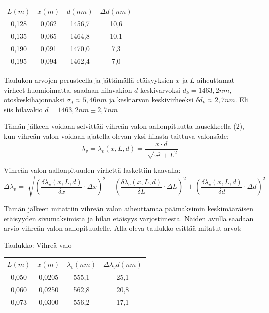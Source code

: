 \documentclass[11pt,a4paper]{article}
\begin{document}
\hspace{2cm}\begin{tabular}{|c|c|c|c|}
\hline
$L(m)$ & $x(m)$ & $d(nm)$ & $\Delta d(nm)$ \\
\hline
0,128 & 0,062 & 1456,7 & 10,6 \\
\hline
0,135 & 0,065 & 1464,8 & 10,1\\
\hline 
0,190 & 0,091 & 1470,0 & 7,3 \\
\hline
0,195 & 0,094 & 1462,4 & 7,0 \\
\hline
\end{tabular}

\pagebreak

\noindent Taulukon arvojen perusteella ja jättämällä etäisyyksien $x$ ja $L$ aiheuttamat virheet huomioimatta, saadaan hilavakion $d$ keskivarvoksi $d_k = 1463,2nm$, otoskeskihajonnaksi ${\sigma}_d \approx 5,46nm$ ja keskiarvon keskivirheeksi $\delta d_k \approx 2,7nm$. Eli siis hilavakio $d=1463,2nm \pm 2,7nm$

Tämän jälkeen voidaan selvittää vihreän valon aallonpituutta lausekkeella (2), kun vihreän valon voidaan ajatella olevan yksi hilasta taittuva valonsäde: 
$${\lambda}_v={\lambda}_v(x,L,d)=\frac{x\cdot d}{\sqrt[]{x^2+L^2}}$$

\noindent Vihreän valon aallonpituuden virhettä laskettiin kaavalla: 
$$\Delta {\lambda}_v= \sqrt[]{(\frac{\delta {\lambda}_v(x, L,d)}{\delta x}\cdot \Delta x)^2 + (\frac{\delta {\lambda}_v(x, L,d)}{\delta L}\cdot \Delta L)^2 + (\frac{\delta {\lambda}_v(x, L,d)}{\delta d}\cdot \Delta d)^2}
$$

\noindent Tämän jälkeen mitattiin vihreän valon aiheuttamaa päämaksimin keskimääräisen etäisyyden sivumaksimista ja hilan etäisyys varjostimesta. Näiden avulla saadaan arvio vihreän valon aallopituudelle. Alla oleva taulukko esittää mitatut arvot: 

\vspace{0.2cm}

\noindent Taulukko: Vihreä valo 

\vspace{0.3cm}

\hspace{2cm}\begin{tabular}{|c|c|c|c|}
\hline
$L(m)$ & $x(m)$ & ${\lambda}_v (nm)$ & $\Delta {\lambda}_v d(nm)$ \\
\hline
0,050 & 0,0205 & 555,1 & 25,1 \\
\hline
0,060 & 0,0250 & 562,8 & 20,8\\
\hline 
0,073 & 0,0300 & 556,2 & 17,1 \\
\hline

\end{tabular}
\end{document}
